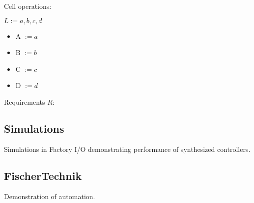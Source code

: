 \documentclass[9pt,conference, compsocconf]{IEEEtran}
\begin{document}
	Cell operations: \hfill
	
	$L := {a, b, c, d}$
	\begin{itemize}
		\item A $:= {a}$
		\item B $:= {b}$
		\item C $:= {c}$
		\item D $:= {d}$
	\end{itemize}
	\hfill
	
	Requirements $R$:
	\begin{center}
	\end{center}

\subsection{Simulations}
\label{sec:factory}
Simulations in Factory I/O demonstrating performance of synthesized controllers.

\subsection{FischerTechnik}
\label{sec:factory}
Demonstration of automation.





%

\end{document}
